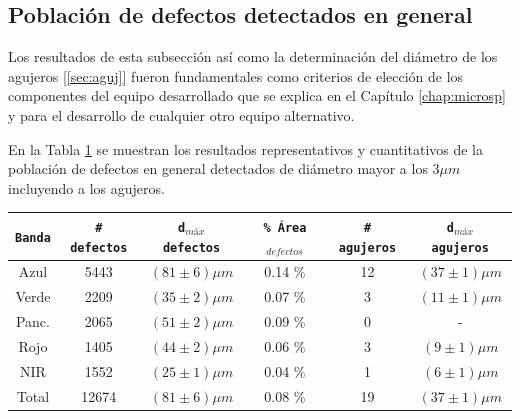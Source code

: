 \subsection{Población de defectos detectados en general \href{https://github.com/jrr1984/defects\_analysis/blob/master/general\_defects\_population.ipynb}{\faGithub}}
\label{sec:defpob}

\hspace{0.5cm}Los resultados de esta subsección así como la determinación del diámetro de los agujeros [\ref{sec:aguj}] fueron fundamentales como criterios de elección de los componentes del equipo desarrollado que se explica en el Capítulo \ref{chap:microsp} y para el desarrollo de cualquier otro equipo alternativo.

En la Tabla \ref{tabpobb} se muestran los resultados representativos y cuantitativos de la población de defectos en general detectados de diámetro mayor a los $3\mu m$ incluyendo a los agujeros.

\begin{table}[H]
\begin{center}
\begin{tabular}{ |c|c|c|c|c|c|}    \toprule
\texttt{Banda} &  \texttt{\# defectos} & \texttt{d$_{máx}$ defectos} & \texttt{\% Área$_{defectos}$} & \texttt{\# agujeros} & \texttt{d$_{máx}$ agujeros} \\\midrule
\rowcolor{blue!15} Azul   & 5443 & $(81 \pm 6) \mu m$ & 0.14 \% &12  & $(37 \pm 1) \mu m$  \\ 
\rowcolor{green!50} Verde  & 2209 & $(35 \pm 2) \mu m$ & 0.07 \% &3 & $(11 \pm 1) \mu m$\\ 
Panc. & 2065 & $(51 \pm 2) \mu m$ & 0.09 \% &0 & -\\
\rowcolor{red!50} Rojo  & 1405  &$(44 \pm 2) \mu m$& 0.06 \% &3 & $(9 \pm 1) \mu m$\\
\rowcolor{maroon!20} NIR   & 1552 & $(25 \pm 1) \mu m$ & 0.04 \% &1 & $(6 \pm 1) \mu m$ \\ \midrule
Total   & 12674 & $(81 \pm 6) \mu m$ & 0.08 \% & 19 & $(37 \pm 1) \mu m$ \\
\bottomrule
 \hline
\end{tabular}
\end{center}
 \label{tabpobb}
\end{table}

